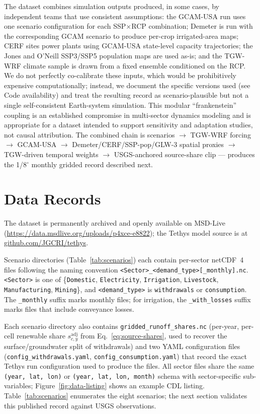 \documentclass[fleqn,10pt]{wlscirep}
\begin{document}
The dataset combines simulation outputs produced, in some cases, by independent teams that use consistent assumptions: the GCAM-USA run uses one scenario configuration for each SSP$\times$RCP combination; Demeter is run with the corresponding GCAM scenario to produce per-crop irrigated-area maps; CERF sites power plants using GCAM-USA state-level capacity trajectories; the Jones and O'Neill SSP3/SSP5 population maps are used as-is; and the TGW-WRF climate sample is drawn from a fixed ensemble conditioned on the RCP. We do not perfectly co-calibrate these inputs, which would be prohibitively expensive computationally; instead, we document the specific versions used (see Code availability) and treat the resulting record as scenario-plausible but not a single self-consistent Earth-system simulation. This modular ``frankenstein'' coupling is an established compromise in multi-sector dynamics modeling\cite{Khan2023} and is appropriate for a dataset intended to support sensitivity and adaptation studies, not causal attribution. The combined chain is scenarios $\to$ TGW-WRF forcing $\to$ GCAM-USA $\to$ Demeter/CERF/SSP-pop/GLW-3 spatial proxies $\to$ TGW-driven temporal weights $\to$ USGS-anchored source-share clip --- produces the 1/8$^{\circ}$ monthly gridded record described next.

\section*{Data Records}

The dataset is permanently archived and openly available on MSD-Live (\url{https://data.msdlive.org/uploads/p4xce-e8822}); the Tethys model source is at \href{https://github.com/JGCRI/tethys}{github.com/JGCRI/tethys}.

Scenario directories (Table~\ref{tab:scenarios}) each contain per-sector netCDF~4 files following the naming convention \texttt{<Sector>\_<demand\_type>[\_monthly].nc}. \texttt{<Sector>} is one of \{\texttt{Domestic}, \texttt{Electricity}, \texttt{Irrigation}, \texttt{Livestock}, \texttt{Manufacturing}, \texttt{Mining}\}, and \texttt{<demand\_type>} is \texttt{withdrawals} or \texttt{consumption}. The \texttt{\_monthly} suffix marks monthly files; for irrigation, the \texttt{\_with\_losses} suffix marks files that include conveyance losses.

Each scenario directory also contains \texttt{gridded\_runoff\_shares.nc} (per-year, per-cell renewable share $s^{\mathrm{adj}}_{c,y}$ from Eq.~\ref{eq:source-shares}, used to recover the surface/groundwater split of withdrawals) and two YAML configuration files (\texttt{config\_withdrawals.yaml}, \texttt{config\_consumption.yaml}) that record the exact Tethys run configuration used to produce the files. All sector files share the same \texttt{(year, lat, lon)} or \texttt{(year, lat, lon, month)} schema with sector-specific sub-variables; Figure~\ref{fig:data-listing} shows an example CDL listing. Table~\ref{tab:scenarios} enumerates the eight scenarios; the next section validates this published record against USGS observations.
\end{document}

